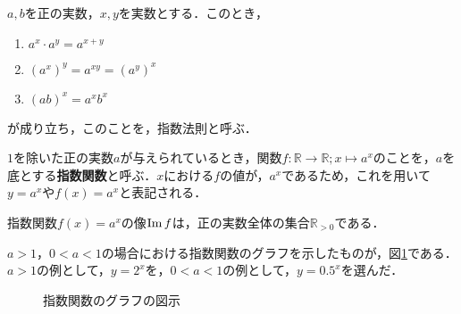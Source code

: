 \begin{definition}[実数における指数法則]
	\label{def:exponentialLawR}%
	$a, b$を正の実数，$x, y$を実数とする．このとき，
	\begin{enumerate}[1.]
		\item $a^x\cdot a^y = a^{x+y}$
		\item $\left(a^x\right)^y = a^{xy} = \left(a^y\right)^x$
		\item $\left(ab\right)^x = a^xb^x$
	\end{enumerate}
	が成り立ち，このことを，指数法則と呼ぶ．
\end{definition}
\begin{definition}[指数関数]
	$1$を除いた正の実数$a$が与えられているとき，関数$f : \mathbb{R} \rightarrow \mathbb{R}; x \mapsto a^x$のことを，$a$を底とする\textbf{指数関数}と呼ぶ．$x$における$f$の値が，$a^x$であるため，これを用いて$y = a^x$や$f(x) = a^x$と表記される．
\end{definition}
\begin{rem*}
	指数関数$f(x) = a^x$の像$\operatorname{Im} f$は，正の実数全体の集合$\mathbb{R}_{>0}$である．
\end{rem*}
\begin{example*}
	$a > 1$，$0 < a < 1$の場合における指数関数のグラフを示したものが，図\ref{fig:exponentialFunction}である．$a > 1$の例として，$y = 2^x$を，$0 < a< 1$の例として，$y=0.5^x$を選んだ．
	
	\begin{figure}[!h]
		\centering
		\caption{指数関数のグラフの図示}
		\label{fig:exponentialFunction}
	\end{figure}
\end{example*}

